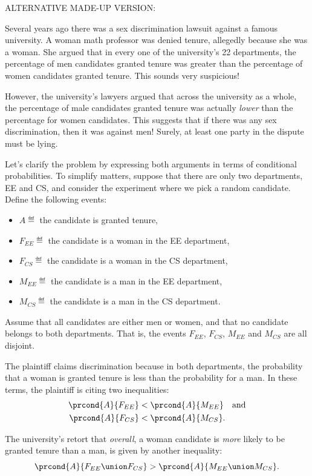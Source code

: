 \begin{editingnotes}
ALTERNATIVE MADE-UP VERSION:

Several years ago there was a sex discrimination lawsuit against a
famous university.  A woman math professor was denied tenure,
allegedly because she was a woman.  She argued that in every one of
the university's 22 departments, the percentage of men candidates
granted tenure was greater than the percentage of women candidates
granted tenure.  This sounds very suspicious!

However, the university's lawyers argued that across the university as
a whole, the percentage of male candidates granted tenure was actually
\emph{lower} than the percentage for women candidates.  This suggests
that if there was any sex discrimination, then it was against men!
Surely, at least one party in the dispute must be lying.

Let's clarify the problem by expressing both arguments in terms of
conditional probabilities.  To simplify matters, suppose that there
are only two departments, EE and CS, and consider the experiment where
we pick a random candidate.  Define the following events:
%
\begin{itemize}
\item $A \eqdef$ the candidate is granted tenure,
\item $F_{EE} \eqdef$ the candidate is a woman in the EE department,
\item $F_{CS} \eqdef$ the candidate is a woman in the CS department,
\item $M_{EE} \eqdef$ the candidate is a man in the EE department,
\item $M_{CS} \eqdef$ the candidate is a man in the CS department.
\end{itemize}

Assume that all candidates are either men or women, and that no
candidate belongs to both departments.  That is, the events $F_{EE}$,
$F_{CS}$, $M_{EE}$ and $M_{CS}$ are all disjoint.

The plaintiff claims discrimination because in both departments, the
probability that a woman is granted tenure is less than the
probability for a man.  In these terms, the plaintiff is citing two
inequalities:
\begin{align*}
\prcond{A}{F_{EE}} & < \prcond{A}{M_{EE}} \quad\text{and}\\
\prcond{A}{F_{CS}} & < \prcond{A}{M_{CS}}.
\end{align*}

The university's retort that \emph{overall}, a woman candidate is
\emph{more} likely to be granted tenure than a man, is given by
another inequality:
\[
    \prcond{A}{F_{EE} \union F_{CS}} > \prcond{A}{M_{EE} \union M_{CS}}.
\]


\end{editingnotes}

